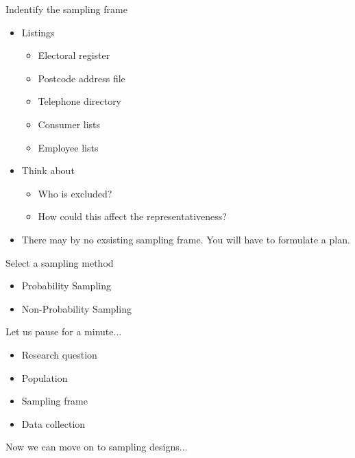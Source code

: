 \documentclass[10pt, compress]{beamer}
\begin{document}
\begin{frame}[t]{Indentify the sampling frame}
    \begin{itemize}
        \item Listings
        \begin{itemize}
            \item Electoral register
            \item Postcode address file
            \item Telephone directory
            \item Consumer lists
            \item Employee lists
        \end{itemize}
        \item Think about
        \begin{itemize}
            \item Who is excluded?
            \item How could this affect the representativeness?
        \end{itemize}
        \item There may by no exsisting sampling frame. You will have to formulate a plan.
    \end{itemize}
\end{frame}

\begin{frame}[t]{Select a sampling method}
    \begin{itemize}
        \item Probability Sampling
        \item Non-Probability Sampling
    \end{itemize}
\end{frame}

\begin{frame}[t]{Let us pause for a minute...}
    \begin{itemize}
        \item Research question
        \item Population
        \item Sampling frame
        \item Data collection
    \end{itemize}
    \bigskip
    Now we can move on to sampling designs...
\end{frame}
\end{document}
